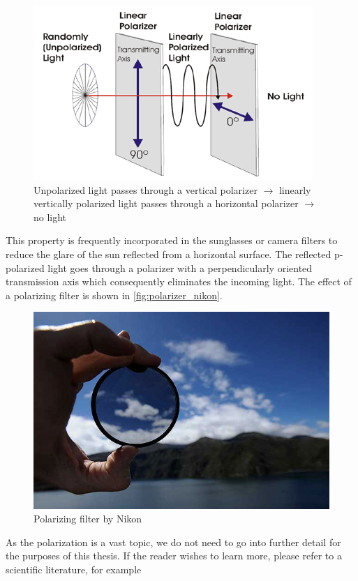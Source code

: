 \begin{figure}[h]
	\centering
	\includegraphics[width=.6\linewidth]{img/polarizer.png}
	\caption[nikon]{Unpolarized light passes through a vertical polarizer $\rightarrow$ linearly vertically polarized light passes through a horizontal polarizer $\rightarrow$ no light\footnotemark}
	\label{fig:polarizer}
\end{figure}

This property is frequently incorporated in the sunglasses or camera filters to reduce the glare of the sun reflected from a horizontal surface. The reflected p-polarized light goes through a polarizer with a perpendicularly oriented transmission axis which consequently eliminates the incoming light. The effect of a polarizing filter is shown in \autoref{fig:polarizer_nikon}.

\begin{figure}[h]
	\centering
	\includegraphics[width=.7\linewidth]{img/polarizer_nikon.jpg}
	\caption[nikon]{Polarizing filter by Nikon\footnotemark}
	\label{fig:polarizer_nikon}
\end{figure}

As the polarization is a vast topic, we do not need to go into further detail for the purposes of this thesis. If the reader wishes to learn more, please refer to a scientific literature, for example \citet{kliger2012polarized}

